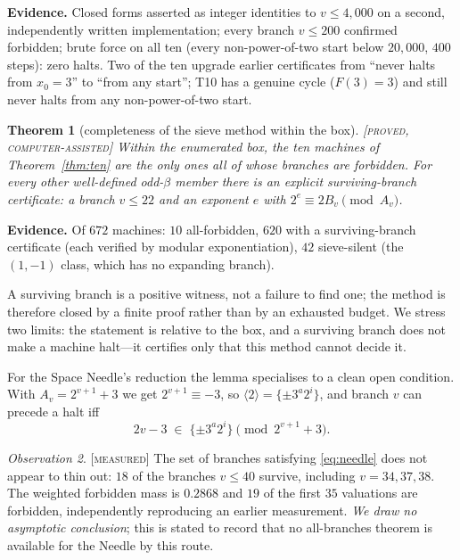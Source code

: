 \documentclass[11pt]{article}
\newtheorem{theorem}{Theorem}[section]
\theoremstyle{definition}
\theoremstyle{remark}
\newtheorem{observation}[theorem]{Observation}
\newenvironment{evidence}
  {\par\smallskip\noindent\footnotesize\textbf{Evidence.}}
  {\par\smallskip}
\newcommand{\CAP}{\textsc{[proved, computer-assisted]}}
\newcommand{\Meas}{\textsc{[measured]}}
\begin{document}
\begin{evidence}
Closed forms asserted as integer identities to $v\le4{,}000$ on a second,
independently written implementation; every branch $v\le200$ confirmed
forbidden; brute force on all ten (every non-power-of-two start below
$20{,}000$, $400$ steps): zero halts.  Two of the ten upgrade earlier
certificates from ``never halts from $x_0=3$'' to ``from any start''; T10 has a
genuine cycle ($F(3)=3$) and still never halts from any non-power-of-two start.
\end{evidence}

\begin{theorem}[completeness of the sieve method within the box]
\label{thm:complete}
\CAP{}\; Within the enumerated box, the ten machines of
Theorem~\ref{thm:ten} are the only ones all of whose branches are forbidden.
For every other well-defined odd-$\beta$ member there is an explicit
\emph{surviving-branch certificate}: a branch $v\le22$ and an exponent $e$
with $2^{e}\equiv 2B_v\pmod{A_v}$.
\end{theorem}

\begin{evidence}
Of $672$ machines: $10$ all-forbidden, $620$ with a surviving-branch
certificate (each verified by modular exponentiation), $42$ sieve-silent (the
$(1,-1)$ class, which has no expanding branch).
\end{evidence}

A surviving branch is a positive witness, not a failure to find one; the
method is therefore closed by a finite proof rather than by an exhausted
budget.  We stress two limits: the statement is relative to the box, and a
surviving branch does not make a machine halt---it certifies only that this
method cannot decide it.

For the Space Needle's reduction the lemma specialises to a clean open
condition.  With $A_v=2^{v+1}+3$ we get $2^{v+1}\equiv-3$, so
$\langle2\rangle=\{\pm3^{a}2^{i}\}$, and branch $v$ can precede a halt iff
\begin{equation}\label{eq:needle}
2v-3 \;\in\; \{\pm 3^{a}2^{i}\} \pmod{2^{v+1}+3}.
\end{equation}

\begin{observation}\label{obs:nothinning}
\Meas{}\; The set of branches satisfying \eqref{eq:needle} does not appear to
thin out: $18$ of the branches $v\le40$ survive, including $v=34,37,38$.  The
weighted forbidden mass is $0.2868$ and $19$ of the first $35$ valuations are
forbidden, independently reproducing an earlier measurement.  \emph{We draw no
asymptotic conclusion}; this is stated to record that no all-branches theorem
is available for the Needle by this route.
\end{observation}
\end{document}
